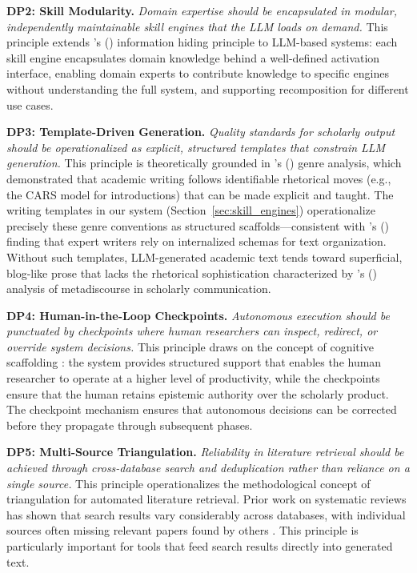 \documentclass{article}
\begin{document}
\textbf{DP2: Skill Modularity.} \emph{Domain expertise should be encapsulated in modular, independently maintainable skill engines that the LLM loads on demand.} This principle extends \citeauthor{parnas1972criteria}'s (\citeyear{parnas1972criteria}) information hiding principle to LLM-based systems: each skill engine encapsulates domain knowledge behind a well-defined activation interface, enabling domain experts to contribute knowledge to specific engines without understanding the full system, and supporting recomposition for different use cases.

\textbf{DP3: Template-Driven Generation.} \emph{Quality standards for scholarly output should be operationalized as explicit, structured templates that constrain LLM generation.} This principle is theoretically grounded in \citeauthor{swales1990genre}'s (\citeyear{swales1990genre}) genre analysis, which demonstrated that academic writing follows identifiable rhetorical moves (e.g., the CARS model for introductions) that can be made explicit and taught. The writing templates in our system (Section~\ref{sec:skill_engines}) operationalize precisely these genre conventions as structured scaffolds---consistent with \citeauthor{flower1981cognitive}'s (\citeyear{flower1981cognitive}) finding that expert writers rely on internalized schemas for text organization. Without such templates, LLM-generated academic text tends toward superficial, blog-like prose that lacks the rhetorical sophistication characterized by \citeauthor{hyland2005metadiscourse}'s (\citeyear{hyland2005metadiscourse}) analysis of metadiscourse in scholarly communication.

\textbf{DP4: Human-in-the-Loop Checkpoints.} \emph{Autonomous execution should be punctuated by checkpoints where human researchers can inspect, redirect, or override system decisions.} This principle draws on the concept of cognitive scaffolding \citep{vygotsky1978mind}: the system provides structured support that enables the human researcher to operate at a higher level of productivity, while the checkpoints ensure that the human retains epistemic authority over the scholarly product. The checkpoint mechanism ensures that autonomous decisions can be corrected before they propagate through subsequent phases.

\textbf{DP5: Multi-Source Triangulation.} \emph{Reliability in literature retrieval should be achieved through cross-database search and deduplication rather than reliance on a single source.} This principle operationalizes the methodological concept of triangulation \citep{denzin1978research} for automated literature retrieval. Prior work on systematic reviews has shown that search results vary considerably across databases, with individual sources often missing relevant papers found by others \citep{bolanos2024ai_lit_reviews}. This principle is particularly important for tools that feed search results directly into generated text.
\end{document}
